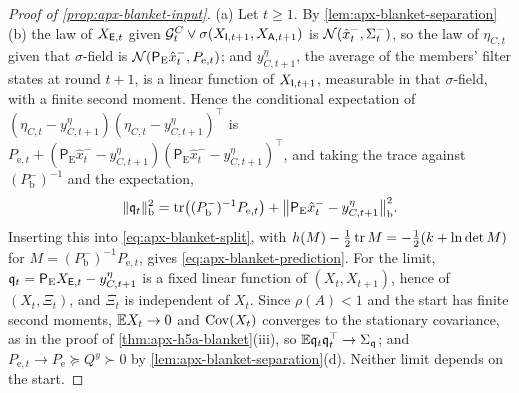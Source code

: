 \begin{proof}[Proof of \cref{prop:apx-blanket-input}]
(a) Let $t\ge1$. By \cref{lem:apx-blanket-separation}(b) the law of $X_{\mathsf{E},t}$ given $\mathcal G^C_t\vee\sigma(X_{\mathsf{I},t+1},X_{\mathsf{A},t+1})$ is $\mathcal{N}(\hat x^-_t,\Sigma^-_t)$, so the law of $\eta_{C,t}$ given that $\sigma$-field is $\mathcal{N}(\mathsf P_{\mathrm E}\hat x^-_t,P_{\mathrm e,t})$; and $y^\eta_{C,t+1}$, the average of the members' filter states at round $t+1$, is a linear function of $X_{\mathsf{I},t+1}$, measurable in that $\sigma$-field, with a finite second moment. Hence the conditional expectation of $(\eta_{C,t}-y^\eta_{C,t+1})(\eta_{C,t}-y^\eta_{C,t+1})^\top$ is $P_{\mathrm e,t}+(\mathsf P_{\mathrm E}\hat x^-_t-y^\eta_{C,t+1})(\mathsf P_{\mathrm E}\hat x^-_t-y^\eta_{C,t+1})^\top$, and taking the trace against $(P^-_{\mathrm b})^{-1}$ and the expectation,
\begin{equation*}
\Vert\mathfrak q_t\Vert_{\mathrm b}^2=\operatorname{tr}\bigl((P^-_{\mathrm b})^{-1}P_{\mathrm e,t}\bigr)+\bigl\Vert\mathsf P_{\mathrm E}\hat x^-_t-y^\eta_{C,t+1}\bigr\Vert_{\mathrm b}^2 .
\end{equation*}
Inserting this into \eqref{eq:apx-blanket-split}, with $h(M)-\frac12\operatorname{tr} M=-\frac12(k+\ln\det M)$ for $M=(P^-_{\mathrm b})^{-1}P_{\mathrm e,t}$, gives \eqref{eq:apx-blanket-prediction}. For the limit, $\mathfrak q_t=\mathsf P_{\mathrm E}X_{\mathsf{E},t}-y^\eta_{C,t+1}$ is a fixed linear function of $(X_t,X_{t+1})$, hence of $(X_t,\Xi_t)$, and $\Xi_t$ is independent of $X_t$. Since $\rho(A)<1$ and the start has finite second moments, $\mathbb{E} X_t\to0$ and $\operatorname{Cov}(X_t)$ converges to the stationary covariance, as in the proof of \cref{thm:apx-h5a-blanket}(iii), so $\mathbb{E}\mathfrak q_t\mathfrak q_t^\top\to\Sigma_{\mathfrak q}$; and $P_{\mathrm e,t}\to P_{\mathrm e}\succeq Q^y\succ0$ by \cref{lem:apx-blanket-separation}(d). Neither limit depends on the start.


\end{proof}
